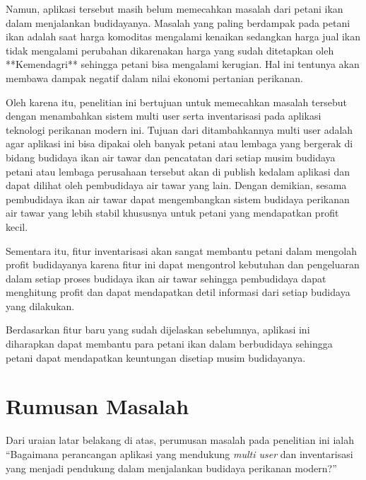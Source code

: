 Namun, aplikasi tersebut masih belum memecahkan masalah dari petani ikan dalam menjalankan budidayanya. Masalah yang paling berdampak pada petani ikan adalah saat harga komoditas mengalami kenaikan sedangkan harga jual ikan tidak mengalami perubahan dikarenakan harga yang sudah ditetapkan oleh **Kemendagri** sehingga petani bisa mengalami kerugian. Hal ini tentunya akan membawa dampak negatif dalam nilai ekonomi pertanian perikanan.

Oleh karena itu, penelitian ini bertujuan untuk memecahkan masalah tersebut dengan menambahkan sistem multi user serta inventarisasi pada aplikasi teknologi perikanan modern ini. Tujuan dari ditambahkannya multi user adalah agar aplikasi ini bisa dipakai oleh banyak petani atau lembaga yang bergerak di bidang budidaya ikan air tawar dan pencatatan dari setiap musim budidaya petani atau lembaga perusahaan tersebut akan di publish kedalam aplikasi dan dapat dilihat oleh pembudidaya air tawar yang lain. Dengan demikian, sesama pembudidaya ikan air tawar dapat mengembangkan sistem budidaya perikanan air tawar yang lebih stabil khususnya untuk petani yang mendapatkan profit kecil. 

Sementara itu, fitur inventarisasi akan sangat membantu petani dalam mengolah profit budidayanya karena fitur ini dapat mengontrol kebutuhan dan pengeluaran dalam setiap proses budidaya ikan air tawar sehingga pembudidaya dapat menghitung profit dan dapat mendapatkan detil informasi dari setiap budidaya yang dilakukan.

Berdasarkan fitur baru yang sudah dijelaskan sebelumnya, aplikasi ini diharapkan dapat membantu para petani ikan dalam berbudidaya sehingga petani dapat mendapatkan keuntungan disetiap musim budidayanya.


\section{Rumusan Masalah}
Dari uraian latar belakang di atas, perumusan masalah pada penelitian ini ialah “Bagaimana perancangan aplikasi yang mendukung \emph{multi user} dan inventarisasi yang menjadi pendukung dalam menjalankan budidaya perikanan modern?”

